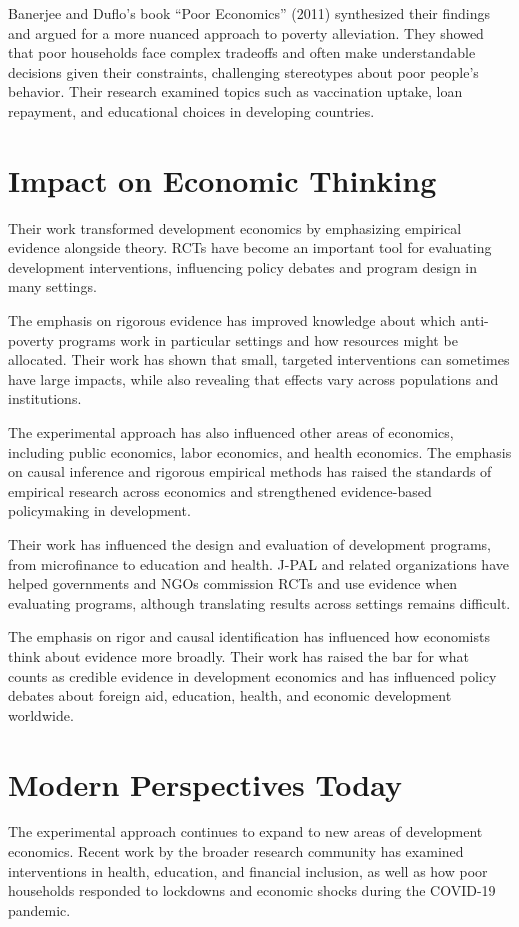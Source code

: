 Banerjee and Duflo's book ``Poor Economics'' (2011) synthesized their findings
and argued for a more nuanced approach to poverty alleviation. They showed that
poor households face complex tradeoffs and often make understandable decisions
given their constraints, challenging stereotypes about poor people's behavior.
Their research examined topics such as vaccination uptake, loan repayment, and
educational choices in developing countries.

\section{Impact on Economic Thinking}
Their work transformed development economics by emphasizing empirical evidence
alongside theory. RCTs have become an important tool for evaluating development
interventions, influencing policy debates and program design in many settings.

The emphasis on rigorous evidence has improved knowledge about which anti-poverty
programs work in particular settings and how resources might be allocated. Their
work has shown that small, targeted interventions can sometimes have large impacts,
while also revealing that effects vary across populations and institutions.

The experimental approach has also influenced other areas of economics, including
public economics, labor economics, and health economics. The emphasis on causal
inference and rigorous empirical methods has raised the standards of empirical
research across economics and strengthened evidence-based policymaking in
development.

Their work has influenced the design and evaluation of development programs, from
microfinance to education and health. J-PAL and related organizations have helped
governments and NGOs commission RCTs and use evidence when evaluating programs,
although translating results across settings remains difficult.

The emphasis on rigor and causal identification has influenced how economists think about
evidence more broadly. Their work has raised the bar for what counts as credible evidence
in development economics and has influenced policy debates about foreign aid, education,
health, and economic development worldwide.

\section{Modern Perspectives Today}
The experimental approach continues to expand to new areas of development
economics. Recent work by the broader research community has examined interventions
in health, education, and financial inclusion, as well as how poor households
responded to lockdowns and economic shocks during the COVID-19 pandemic.

